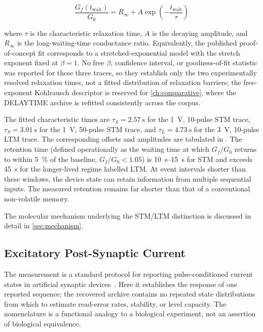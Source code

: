 \documentclass[12pt, twoside]{report}
\begin{document}
\begin{equation}
  \frac{G_f(t_{\mathrm{wait}})}{G_0} = R_\infty + A \exp\!\left(-\frac{t_{\mathrm{wait}}}{\tau}\right)
  \label{eq:retention_exp}
\end{equation}

where $\tau$ is the characteristic relaxation time, $A$ is the decaying amplitude, and $R_\infty$ is the long-waiting-time conductance ratio. Equivalently, the published proof-of-concept fit corresponds to a stretched-exponential model with the stretch exponent fixed at $\beta=1$. No free $\beta$, confidence interval, or goodness-of-fit statistic was reported for these three traces, so they establish only the two experimentally resolved relaxation times, not a fitted distribution of relaxation barriers; the free-exponent Kohlrausch descriptor is reserved for \cref{ch:comparative}, where the DELAYTIME archive is refitted consistently across the corpus.

The fitted characteristic times are $\tau_S = \SI{2.57}{\second}$ for the \SI{1}{\volt}, 10-pulse STM trace, $\tau_S = \SI{3.01}{\second}$ for the \SI{1}{\volt}, 50-pulse STM trace, and $\tau_L = \SI{4.73}{\second}$ for the \SI{3}{\volt}, 10-pulse LTM trace. The corresponding offsets and amplitudes are tabulated in . The retention time (defined operationally as the waiting time at which $G_f/G_0$ returns to within \SI{5}{\percent} of the baseline, $G_f/G_0 < 1.05$) is \SIrange{10}{15}{\second} for STM and exceeds \SI{45}{\second} for the longer-lived regime labelled LTM. At event intervals shorter than these windows, the device state can retain information from multiple sequential inputs. The measured retention remains far shorter than that of a conventional non-volatile memory.

The molecular mechanism underlying the STM/LTM distinction is discussed in detail in \cref{sec:mechanism}.

\subsection{Excitatory Post-Synaptic Current}\label{subsec:epsc}

The \EPSC{} measurement is a standard protocol for reporting pulse-conditioned current states in artificial synaptic devices~\cite{Kim2018, VanDeBurgt2018}. Here it establishes the response of one reported sequence; the recovered archive contains no repeated state distributions from which to estimate read-error rates, stability, or level capacity. The nomenclature is a functional analogy to a biological experiment, not an assertion of biological equivalence.
\end{document}

